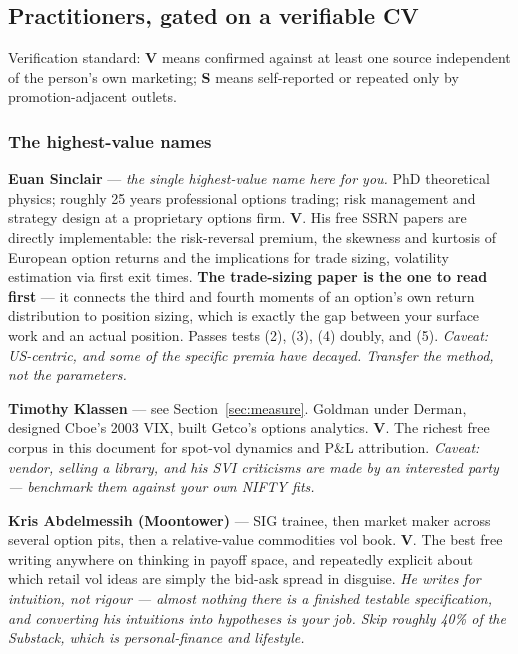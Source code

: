 \documentclass[11pt,a4paper]{article}
\begin{document}
\subsection{Practitioners, gated on a verifiable CV}

Verification standard: \textbf{V} means confirmed against at least one source
independent of the person's own marketing; \textbf{S} means self-reported or
repeated only by promotion-adjacent outlets.

\subsubsection{The highest-value names}

\textbf{Euan Sinclair} --- \emph{the single highest-value name here for you.}
PhD theoretical physics; roughly 25 years professional options trading; risk
management and strategy design at a proprietary options firm. \textbf{V}. His free
SSRN papers are directly implementable: the risk-reversal premium, the skewness
and kurtosis of European option returns and the implications for trade sizing,
volatility estimation via first exit times. \textbf{The trade-sizing paper is the
one to read first} --- it connects the third and fourth moments of an option's own
return distribution to position sizing, which is exactly the gap between your
surface work and an actual position. Passes tests (2), (3), (4) doubly, and (5).
\emph{Caveat: US-centric, and some of the specific premia have decayed. Transfer
the method, not the parameters.}

\textbf{Timothy Klassen} --- see Section~\ref{sec:measure}. Goldman under Derman,
designed Cboe's 2003 VIX, built Getco's options analytics. \textbf{V}. The richest
free corpus in this document for spot-vol dynamics and P\&L attribution.
\emph{Caveat: vendor, selling a library, and his SVI criticisms are made by an
interested party --- benchmark them against your own NIFTY fits.}

\textbf{Kris Abdelmessih (Moontower)} --- SIG trainee, then market maker across
several option pits, then a relative-value commodities vol book. \textbf{V}. The
best free writing anywhere on thinking in payoff space, and repeatedly explicit
about which retail vol ideas are simply the bid-ask spread in disguise. \emph{He
writes for intuition, not rigour --- almost nothing there is a finished testable
specification, and converting his intuitions into hypotheses is your job. Skip
roughly 40\% of the Substack, which is personal-finance and lifestyle.}
\end{document}
